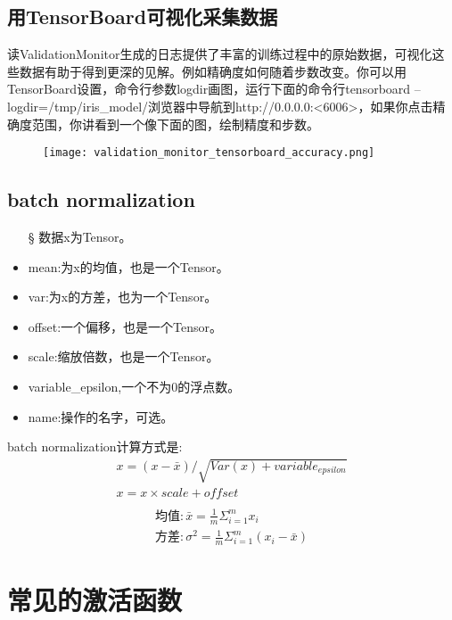 \subsection{用TensorBoard可视化采集数据}
读ValidationMonitor生成的日志提供了丰富的训练过程中的原始数据，可视化这些数据有助于得到更深的见解。例如精确度如何随着步数改变。你可以用TensorBoard设置，命令行参数logdir画图，运行下面的命令行tensorboard --logdir=/tmp/iris\_model/浏览器中导航到http://0.0.0.0:<6006>，如果你点击精确度范围，你讲看到一个像下面的图，绘制精度和步数。
\begin{figure}[H]
\texttt{[image: validation\_monitor\_tensorboard\_accuracy.png]}
\end{figure}

\subsection{batch normalization}
\begin{itemize}
	\item[\S] 数据x为Tensor。
\item mean:为x的均值，也是一个Tensor。
\item var:为x的方差，也为一个Tensor。
\item offset:一个偏移，也是一个Tensor。
\item scale:缩放倍数，也是一个Tensor。
\item variable\_epsilon,一个不为0的浮点数。
\item name:操作的名字，可选。
\end{itemize}
batch normalization计算方式是:
\begin{gather}
x = (x-\bar{x})/\sqrt{Var(x)+variable_{epsilon}}\\
x = x\times scale+offset\\
\end{gather}
\begin{gather}
\text{均值}:\bar{x} = \frac{1}{m}\Sigma_{i=1}^{m}x_i\\
\text{方差}:\sigma^2 = \frac{1}{m}\Sigma_{i=1}^m(x_i-\bar{x})
\end{gather}
\section{常见的激活函数}
